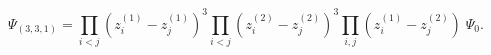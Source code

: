 \begin{equation}
\Psi_{(3,3,1)}=
\prod_{i<j} (z_i^{(1)}-z_j^{(1)})^{3}
\prod_{i<j} (z_i^{(2)}-z_j^{(2)})^{3}
\prod_{i,j} (z_i^{(1)}-z_j^{(2)})\; \Psi_{0}.
\end{equation}

